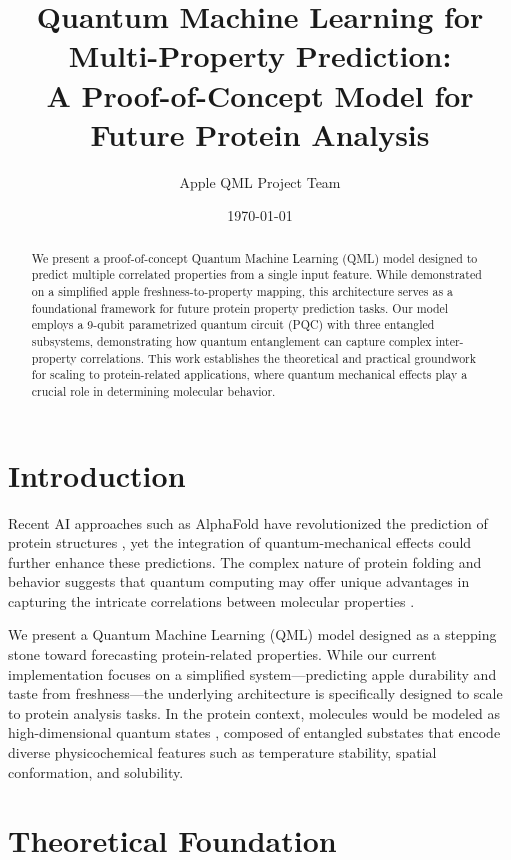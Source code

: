 \documentclass[11pt,a4paper]{article}
\title{Quantum Machine Learning for Multi-Property Prediction: \\
A Proof-of-Concept Model for Future Protein Analysis}
\author{Apple QML Project Team}
\date{\today}
\begin{document}
\maketitle

\begin{abstract}
We present a proof-of-concept Quantum Machine Learning (QML) model designed to predict multiple correlated properties from a single input feature. While demonstrated on a simplified apple freshness-to-property mapping, this architecture serves as a foundational framework for future protein property prediction tasks. Our model employs a 9-qubit parametrized quantum circuit (PQC) with three entangled subsystems, demonstrating how quantum entanglement can capture complex inter-property correlations. This work establishes the theoretical and practical groundwork for scaling to protein-related applications, where quantum mechanical effects play a crucial role in determining molecular behavior.
\end{abstract}

\section{Introduction}

Recent AI approaches such as AlphaFold have revolutionized the prediction of protein structures \cite{jumper2021alphafold}, yet the integration of quantum-mechanical effects could further enhance these predictions. The complex nature of protein folding and behavior suggests that quantum computing may offer unique advantages in capturing the intricate correlations between molecular properties \cite{cao2019quantum}.

We present a Quantum Machine Learning (QML) model designed as a stepping stone toward forecasting protein-related properties. While our current implementation focuses on a simplified system—predicting apple durability and taste from freshness—the underlying architecture is specifically designed to scale to protein analysis tasks. In the protein context, molecules would be modeled as high-dimensional quantum states \cite{mcardle2020quantum}, composed of entangled substates that encode diverse physicochemical features such as temperature stability, spatial conformation, and solubility.

\section{Theoretical Foundation}
\end{document}

